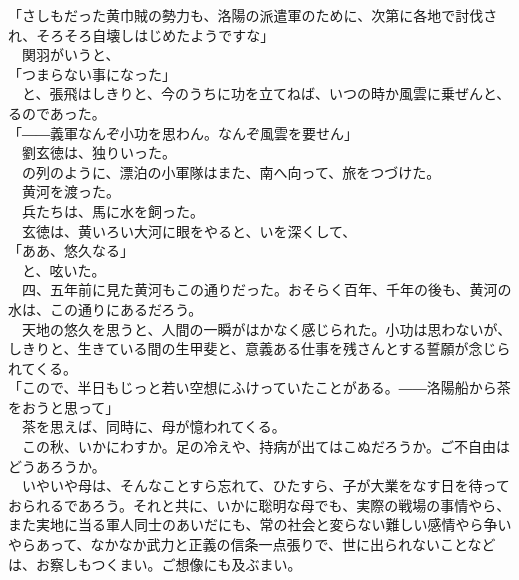\documentclass[
  paper=a5,
  fontsize=10pt,
  jafontsize=9.5pt,
  tate,                  %
  open_bracket_pos=nibu, %
]{jlreq}
\begin{document}
「さしもだった黄巾賊の勢力も、洛陽の派遣軍のために、次第に各地で討伐され、そろそろ自壊しはじめたようですな」\\


　関羽がいうと、\\


「つまらない事になった」\\


　と、張飛はしきりと、今のうちに功を立てねば、いつの時か風雲に乗ぜんと、るのであった。\\


「――義軍なんぞ小功を思わん。なんぞ風雲を要せん」\\


　劉玄徳は、独りいった。\\


　の列のように、漂泊の小軍隊はまた、南へ向って、旅をつづけた。\\


　黄河を渡った。\\


　兵たちは、馬に水を飼った。\\


　玄徳は、黄いろい大河に眼をやると、いを深くして、\\


「ああ、悠久なる」\\


　と、呟いた。\\


　四、五年前に見た黄河もこの通りだった。おそらく百年、千年の後も、黄河の水は、この通りにあるだろう。\\


　天地の悠久を思うと、人間の一瞬がはかなく感じられた。小功は思わないが、しきりと、生きている間の生甲斐と、意義ある仕事を残さんとする誓願が念じられてくる。\\


「こので、半日もじっと若い空想にふけっていたことがある。――洛陽船から茶をおうと思って」\\


　茶を思えば、同時に、母が憶われてくる。\\


　この秋、いかにわすか。足の冷えや、持病が出てはこぬだろうか。ご不自由はどうあろうか。\\


　いやいや母は、そんなことすら忘れて、ひたすら、子が大業をなす日を待っておられるであろう。それと共に、いかに聡明な母でも、実際の戦場の事情やら、また実地に当る軍人同士のあいだにも、常の社会と変らない難しい感情やら争いやらあって、なかなか武力と正義の信条一点張りで、世に出られないことなどは、お察しもつくまい。ご想像にも及ぶまい。\\
\end{document}

